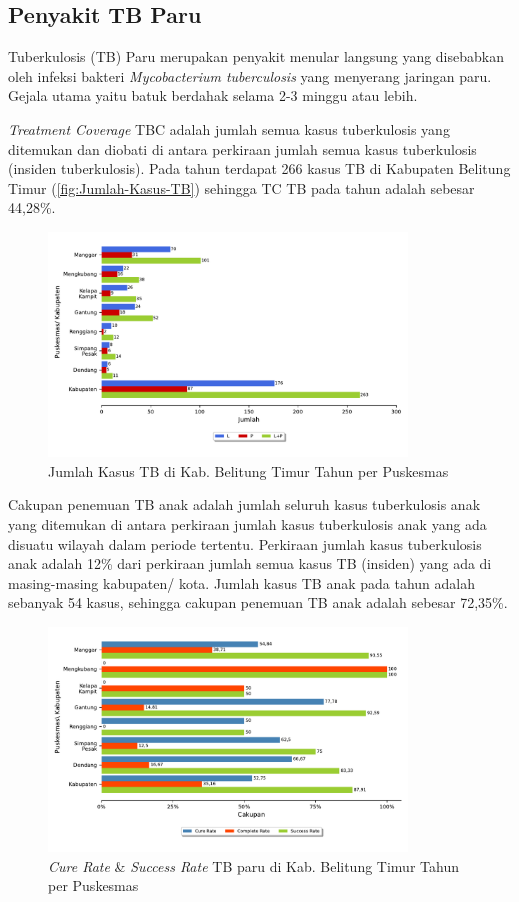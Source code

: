 \subsection{Penyakit TB Paru}
Tuberkulosis (TB) Paru merupakan penyakit menular langsung yang disebabkan oleh infeksi bakteri \emph{Mycobacterium tuberculosis} yang menyerang jaringan paru. Gejala utama yaitu batuk berdahak selama 2-3 minggu atau lebih.

\emph{Treatment Coverage} TBC adalah jumlah semua kasus tuberkulosis yang ditemukan dan diobati di antara perkiraan jumlah semua kasus tuberkulosis (insiden
tuberkulosis). Pada tahun \tP terdapat 266 kasus TB di Kabupaten Belitung Timur (\autoref{fig:Jumlah-Kasus-TB}) sehingga TC TB pada tahun \tP adalah sebesar 44,28\%.

\begin{figure}[H]
  \centering
  \includegraphics[width=0.85\textwidth]{bab_06/bab_06_01a_kasusTB}
  \caption{Jumlah Kasus TB di Kab. Belitung Timur Tahun \tP per Puskesmas}
  \label{fig:Jumlah-Kasus-TB}
\end{figure}

Cakupan penemuan TB anak adalah jumlah seluruh kasus tuberkulosis anak yang ditemukan di antara perkiraan jumlah kasus tuberkulosis anak yang ada disuatu wilayah dalam periode tertentu. Perkiraan jumlah kasus tuberkulosis  anak adalah 12\% dari perkiraan jumlah semua kasus TB (insiden) yang ada di masing-masing kabupaten/ kota. Jumlah kasus TB anak pada tahun \tP adalah sebanyak 54 kasus, sehingga cakupan penemuan TB anak adalah sebesar 72,35\%.

\begin{figure}[H]
    \centering
    \includegraphics[width=0.85\textwidth]{bab_06/bab_06_01b_cureCompSuccRateTB}
    \caption{\emph{Cure Rate} \& \emph{Success Rate} TB paru di Kab. Belitung Timur Tahun \tP per Puskesmas}
    \label{fig:Cure-Rate-TB}
\end{figure}

